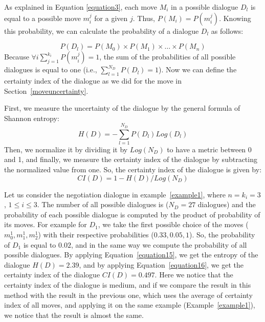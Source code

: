 As explained in Equation \ref{equation3}, each move $M_i$ in a possible dialogue $D_l$ is equal to a possible move $m_i^j$ for a
given $j$. Thus, $P(M_i) = P(m_i^j)$. Knowing this probability, we can calculate the probability of a dialogue $D_l$ as follows:

\begin{equation}\label{equation14}
P(D_l)=P(M_0) \times P(M_1) \times \ldots \times P(M_n)
\end{equation}
%
Because $\forall i \sum_{j=1}^{k_i} P(m_i^j)=1$, the sum of the probabilities of all possible dialogues is equal to one (i.e., $\sum_{l=1}^{N_D} P(D_l)=1$).
Now we can define the certainty index of the dialogue as we did for the move in Section~\ref{moveuncertainty}.

First, we measure the uncertainty of the dialogue by the general formula of Shannon entropy:
%
\begin{equation}\label{equation15}
H(D) = -\sum_{l=1}^{N_D}P(D_l) Log(D_l)
\end{equation}
%
Then, we normalize it by dividing it by $Log(N_D)$ to have a metric between 0 and 1, and finally, we measure the certainty
index of the dialogue by subtracting the normalized value from one. So, the certainty index of the dialogue is given by:
\begin{equation}\label{equation16}
CI(D) =1 - H(D)/ Log(N_D)
\end{equation}


\begin{example}\label{example4}
Let us consider the negotiation dialogue in example~\ref{example1}, where $n=k_i=3$, $1 \leq i \leq 3$. The number of all possible dialogues is
($N_D = 27$ dialogues) and the probability of each possible dialogue is computed by the product of probability of its moves. For example for $D_1$,
we take the first possible choice of the moves ($m_0^1, m_1^1, m_2^1$) with their respective probabilities ($0.33,0.05,1$). So, the probability of
$D_1$ is equal to $0.02$, and in the same way we compute the probability of all possible dialogues. By applying Equation~\ref{equation15}, we get
the entropy of the dialogue $H(D)=2.39$, and by applying Equation~\ref{equation16}, we get the certainty index of the dialogue $CI(D)=0.497$. Here we
notice that the certainty index of the dialogue is medium, and if we compare the result in this method with the result in the previous one, which uses
the average of certainty index of all moves, and applying it on the same example (Example~\ref{example1}), we notice that the result is almost the same.
\end{example}


